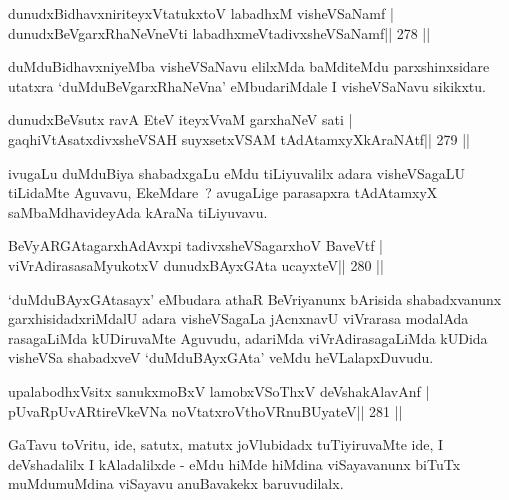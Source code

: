 \begin{shl}
dunudxBidhavxniriteyxVtatukxtoV labadhxM visheVSaNamf |
dunudxBeVgarxRhaNeVneVti labadhxmeVtadivxsheVSaNamf\hfill || 278 ||
\end{shl}

\begin{artha}
duMduBidhavxniyeMba visheVSaNavu elilxMda baMditeMdu parxshinxsidare utatxra `duMduBeVgarxRhaNeVna' eMbudariMdale I visheVSaNavu sikikxtu.
\end{artha}


\begin{shl}
dunudxBeVsutx ravA EteV iteyxVvaM garxhaNeV sati |
gaqhiVtAsatxdivxsheVSAH suyxsetxVSAM tAdAtamxyXkAraNAtf\hfill || 279 ||
\end{shl}

\begin{artha}
ivugaLu duMduBiya shabadxgaLu eMdu tiLiyuvalilx adara visheVSagaLU tiLidaMte Aguvavu, EkeMdare~? avugaLige parasapxra tAdAtamxyX saMbaMdhavideyAda kAraNa tiLiyuvavu.
\end{artha}

\begin{shl}
BeVyARGAtagarxhAdAvx\s pi tadivxsheVSagarxhoV BaveVtf |
viVrAdirasasaMyukotxV dunudxBAyxGAta ucayxteV\hfill || 280 ||
\end{shl}

\begin{artha}
`duMduBAyxGAtasayx' eMbudara athaR \mdash BeVriyanunx bArisida shabadxvanunx garxhisidadxriMdalU adara visheVSagaLa jAcnxnavU viVrarasa modalAda rasagaLiMda kUDiruvaMte Aguvudu, adariMda viVrAdirasagaLiMda kUDida visheVSa shabadxveV `duMduBAyxGAta' veMdu heVLalapxDuvudu.
\end{artha}


\begin{shl}
upalabodhxV\s sitx sanukxmoBxV lamobxVSoThxV deVshakAlavAnf |
pUvaRpUvARtireVkeVNa noVtatxroV\s thoVR\s nuBUyateV\hfill || 281 ||
\end{shl}

\begin{artha}
GaTavu toVritu, ide, satutx, matutx joVlubidadx tuTiyiruvaMte ide, I deVshadalilx I kAladalilxde - eMdu hiMde hiMdina viSayavanunx biTuTx muMdumuMdina viSayavu anuBavakekx baruvudilalx.
\end{artha}

